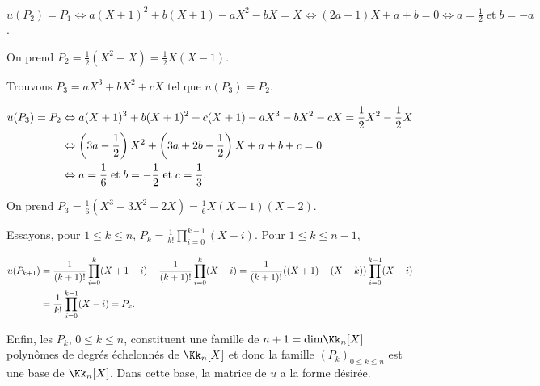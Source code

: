 {\begin{enumerate}
{\begin{center}
$u(P_2) =P_1\Leftrightarrow a(X+1)^2 +b(X+1) - aX^2 - bX =X\Leftrightarrow (2a-1)X +a+b =0\Leftrightarrow a =\frac{1}{2}\;\text{et}\;b = -a$.
\end{center}

On prend $P_2=\frac{1}{2}(X^2-X)=\frac{1}{2}X(X-1)$.

Trouvons $P_3=aX^3 + bX^2+cX$ tel que $u(P_3) = P_2$.

\begin{align*}\ensuremath
u(P_3) =P_2&\Leftrightarrow a(X+1)^3 +b(X+1)^2+c(X+1) - aX^3 - bX^2-cX =\frac{1}{2}X^2-\frac{1}{2}X\\
 &\Leftrightarrow \left(3a-\frac{1}{2}\right)X^2+\left(3a+2b-\frac{1}{2}\right)X+a+b+c=0\\
 &\Leftrightarrow a =\frac{1}{6}\;\text{et}\;b =-\frac{1}{2}\;\text{et}\;c=\frac{1}{3}.
\end{align*}

On prend $P_3=\frac{1}{6}(X^3-3X^2+2X)=\frac{1}{6}X(X-1)(X-2)$.

Essayons, pour $1\leqslant k\leqslant n$, $P_k=\frac{1}{k!}\prod_{i=0}^{k-1}(X-i)$. Pour $1\leqslant k\leqslant n-1$,

\begin{align*}\ensuremath
u(P_{k+1})&=\frac{1}{(k+1)!}\prod_{i=0}^{k}(X+1-i)-\frac{1}{(k+1)!}\prod_{i=0}^{k}(X-i)=\frac{1}{(k+1)!}((X+1)-(X-k))\prod_{i=0}^{k-1}(X-i)\\
 &=\frac{1}{k!}\prod_{i=0}^{k-1}(X-i)=P_k.
\end{align*}

Enfin, les $P_k$, $0\leqslant k\leqslant n$, constituent une famille de $n+1=\text{dim}\Kk_n[X]$ polynômes de degrés échelonnés de $\Kk_n[X]$ et donc la famille $(P_k)_{0\leqslant k\leqslant n}$ est une base de $\Kk_n[X]$. Dans cette base, la matrice de $u$ a la forme désirée.}
\end{enumerate}
}